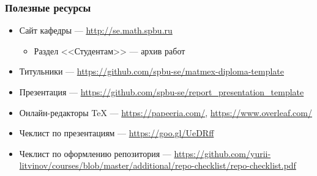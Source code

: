 \documentclass{../../slides-style}
\begin{document}
    \begin{frame}
        \frametitle{Полезные ресурсы}
        \begin{itemize}
            \item Сайт кафедры --- \url{http://se.math.spbu.ru}
            \begin{itemize}
                \item Раздел <<Студентам>> --- архив работ
            \end{itemize}
            \item Титульники --- \url{https://github.com/spbu-se/matmex-diploma-template}
            \item Презентация --- \url{https://github.com/spbu-se/report_presentation_template}
            \item Онлайн-редакторы TeX --- \url{https://papeeria.com/}, \url{https://www.overleaf.com/}
            \item Чеклист по презентациям --- \url{https://goo.gl/UeDRff}
            \item Чеклист по оформлению репозитория --- \url{https://github.com/yurii-litvinov/courses/blob/master/additional/repo-checklist/repo-checklist.pdf}
        \end{itemize}
    \end{frame}
\end{document}
